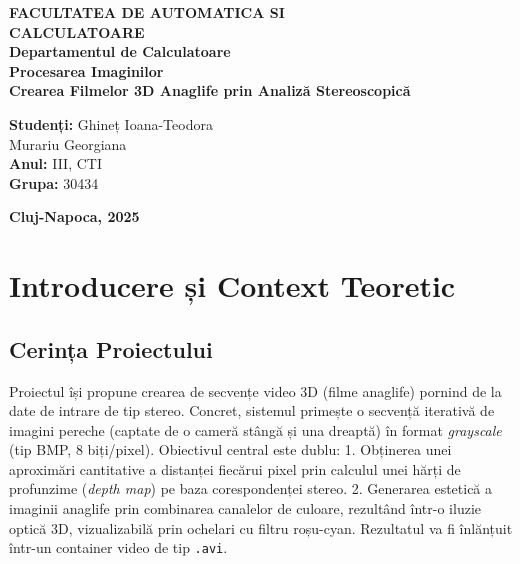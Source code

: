 \documentclass[12pt,a4paper]{report}
\begin{document}


\begin{titlepage}
\centering
{\Large \textbf{FACULTATEA DE AUTOMATICA SI}}\\[0.3cm]
{\Large \textbf{CALCULATOARE}}\\[0.1cm]
{\large \textbf{Departamentul de Calculatoare}}\\[4cm]

{\Huge \textbf{Procesarea Imaginilor}}\\[0.7cm]
{\Large \textbf{Crearea Filmelor 3D Anaglife prin Analiză Stereoscopică}}\\[6cm]

\begin{flushright}
\textbf{Studenți:} Ghineț Ioana-Teodora\\
\textbf{} Murariu Georgiana\\
\textbf{Anul:} III, CTI\\
\textbf{Grupa:} 30434\\
\end{flushright}

\vfill
\centering
\textbf{Cluj-Napoca, 2025}
\end{titlepage}

\restoregeometry

\clearpage
\pagestyle{fancy}
\tableofcontents
\thispagestyle{fancy}
\newpage

\chapter{Introducere și Context Teoretic}

\section{Cerința Proiectului}
Proiectul își propune crearea de secvențe video 3D (filme anaglife) pornind de la date de intrare de tip stereo. Concret, sistemul primește o secvență iterativă de imagini pereche (captate de o cameră stângă și una dreaptă) în format \textit{grayscale} (tip BMP, 8 biți/pixel). Obiectivul central este dublu: 
1. Obținerea unei aproximări cantitative a distanței fiecărui pixel prin calculul unei hărți de profunzime (\textit{depth map}) pe baza corespondenței stereo.
2. Generarea estetică a imaginii anaglife prin combinarea canalelor de culoare, rezultând într-o iluzie optică 3D, vizualizabilă prin ochelari cu filtru roșu-cyan. Rezultatul va fi înlănțuit într-un container video de tip \texttt{.avi}.
\end{document}

